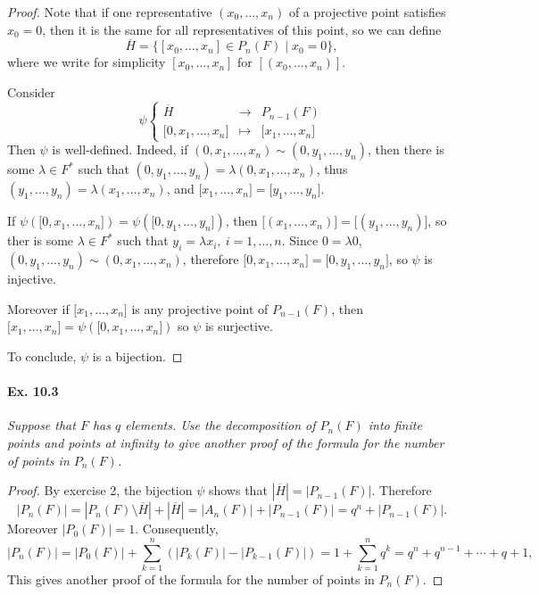 \documentclass[11pt,a4paper]{article}
\begin{document}
\begin{proof}
Note that if one representative $(x_0,\ldots,x_n)$ of a projective point satisfies $x_0 = 0$, then it is the same for all representatives of this point, so we can define
$$\overline{H} = \{[x_0,\ldots,x_n] \in P_n(F) \mid x_0 = 0\},$$
where we write for simplicity $[x_0,\ldots,x_n]$ for $[(x_0,\ldots,x_n)]$.

Consider
$$
\psi
\left\{
\begin{array}{ccl}
\overline{H} & \to &P_{n-1}(F)\\
{[}0,x_1,\ldots,x_n{]}& \mapsto & {[}x_1,\ldots,x_n{]}
\end{array}
\right.
$$
Then $\psi$ is well-defined. Indeed, if $(0,x_1,\ldots,x_n) \sim (0,y_1,\ldots,y_n)$, then there is some $\lambda \in F^*$ such that $(0,y_1,\ldots,y_n) = \lambda (0,x_1,\ldots,x_n)$, thus $(y_1,\ldots,y_n) = \lambda (x_1,\ldots,x_n)$, and $ {[}x_1,\ldots,x_n{]} =  {[}y_1,\ldots,y_n{]}$.

If $ \psi({[}0,x_1,\ldots,x_n{]}) =  \psi({[}0,y_1,\ldots,y_n{]})$, then ${[}(x_1,\ldots,x_n){]} = {[}(y_1,\ldots,y_n){]}$, so ther is some $\lambda \in F^*$ such that $y_i = \lambda x_i, \ i=1,\ldots,n$. Since $0 = \lambda 0$, $(0,y_1,\ldots,y_n) \sim (0,x_1,\ldots,x_n)$, therefore ${[}0,x_1,\ldots,x_n{]} = {[}0,y_1,\ldots,y_n{]}$, so $\psi$ is injective.

Moreover if ${[}x_1,\ldots,x_n{]} $ is any projective point of $P_{n-1}(F)$, then ${[}x_1,\ldots,x_n{]}  =  \psi({[}0,x_1,\ldots,x_n{]})$ so $\psi$ is surjective. 

To conclude, $\psi$ is a bijection.
\end{proof}

\paragraph{Ex. 10.3} {\it Suppose that $F$ has $q$ elements. Use the decomposition of $P_n(F)$ into finite points and points at infinity to give another proof of the formula for the number of points in $P_n(F)$.
}
\begin{proof}

By exercise 2, the bijection $\psi$ shows that $|\overline{H}| = |P_{n-1}(F)|$. Therefore
$$|P_n(F)| = |P_n(F) \setminus \overline{H} | + |\overline{H} | = |A_n(F)| + |P_{n-1}(F)| = q^n +  |P_{n-1}(F)|.$$
Moreover $|P_0(F)| = 1$. Consequently,
$$|P_n(F)|  = |P_0(F)|  + \sum_{k=1}^n (|P_k(F)| - |P_{k-1}(F)| )= 1 + \sum_{k=1}^n q^k = q^n + q^{n-1} + \cdots + q + 1,$$
This gives another proof of the formula for the number of points in $P_n(F)$.
\end{proof}
\end{document}
